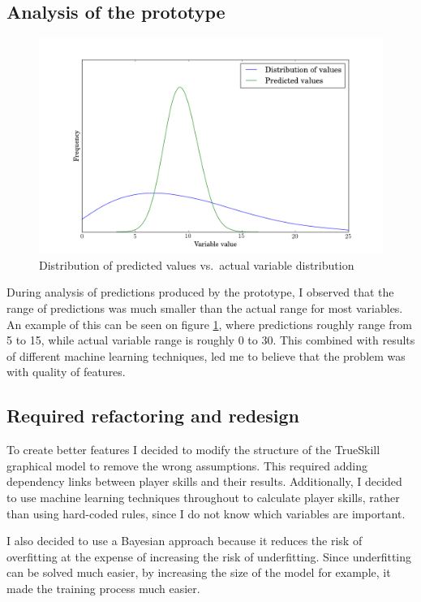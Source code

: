 \documentclass[12pt,a4paper]{book}
\begin{document}
\subsection{Analysis of the prototype}
\begin{figure}[ht]
\centering
\includegraphics[scale=0.5]{predicted_assists}
\caption{Distribution of predicted values vs.\ actual variable distribution}
\label{fig:variablerange}
\end{figure}
During analysis of predictions produced by the prototype, I observed that the range of predictions was much smaller than the actual range for most variables.
An example of this can be seen on figure \ref{fig:variablerange}, where predictions roughly range from 5 to 15, while actual variable range is roughly 0 to 30.
This combined with results of different machine learning techniques, led me to believe that the problem was with quality of features.

\subsection{Required refactoring and redesign}
To create better features I decided to modify the structure of the TrueSkill graphical model to remove the wrong assumptions.
This required adding dependency links between player skills and their results.
Additionally, I decided to use machine learning techniques throughout to calculate player skills, rather than using hard-coded rules, since I do not know which variables are important.

I also decided to use a Bayesian approach because it reduces the risk of overfitting at the expense of increasing the risk of underfitting.
Since underfitting can be solved much easier, by increasing the size of the model for example, it made the training process much easier.
\end{document}
